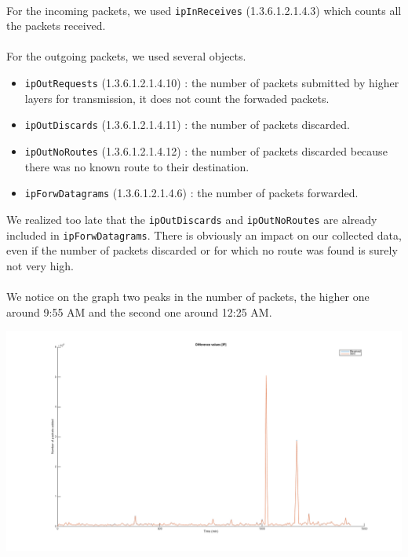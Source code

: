 \documentclass[a4paper,titlepage]{article}
\begin{document}
\paragraph{}
For the incoming packets, we used \texttt{ipInReceives} (1.3.6.1.2.1.4.3) which counts all the packets received. 
\paragraph{}
For the outgoing packets, we used several objects. 
\begin{itemize}
\item \texttt{ipOutRequests} (1.3.6.1.2.1.4.10) : the number of packets submitted by higher layers for transmission, it does not count the forwaded packets.
\item \texttt{ipOutDiscards} (1.3.6.1.2.1.4.11) : the number of packets discarded.
\item \texttt{ipOutNoRoutes} (1.3.6.1.2.1.4.12) : the number of packets discarded because there was no known route to their destination.
\item \texttt{ipForwDatagrams} (1.3.6.1.2.1.4.6) : the number of packets forwarded. 
\end{itemize}
We realized too late that the \texttt{ipOutDiscards} and \texttt{ipOutNoRoutes} are already included in \texttt{ipForwDatagrams}. There is obviously an impact on our collected data, even if the number of packets discarded or for which no route was found is surely not very high.
\paragraph{}
We notice on the graph two peaks in the number of packets, the higher one around 9:55 AM and the second one around 12:25 AM.
\begin{center}
	\includegraphics[scale=0.4, trim = 50mm 0mm 0mm 0mm, clip]{Difference_value_ip.png}
\end{center}
\end{document}
